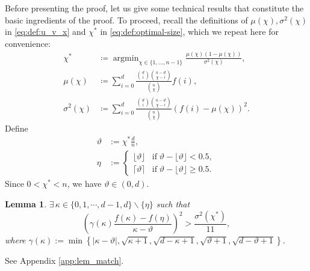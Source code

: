 \documentclass[onecolumn,letterpaper]{IEEEtran}
\DeclareMathOperator*{\argmin}{argmin}
\newtheorem{lemma}{Lemma}
\newcommand{\plsize}{{\chi}}
\newcommand{\mean}{{\mu}}
\newcommand{\var}{{\sigma^{2}}}
\newcommand{\nan}{{\kappa}}
\newcommand{\apn}{{\gamma}}
\newcommand{\mnp}{{\vartheta}}
\newcommand{\idex}{{i}}
\newcommand{\arb}{{\eta}}
\newcommand{\fh}{{h(f)}}
\begin{document}
Before presenting the proof, let us give some technical results that constitute the basic ingredients of the proof.
To proceed, recall the definitions of $\mean(\plsize), \var(\plsize)$ in \eqref{eq:def:u_v_x} and $\plsize^*$ in \eqref{eq:def:optimal-size}, which we repeat here for convenience: 
\begin{equation}
\label{eq:rep:def:mu:v:chi}
\begin{aligned} 
  \plsize^{*}&\coloneqq\argmin_{\plsize\in \{1,\dots,n-1\}} \frac{\mean(\plsize)(1-\mean(\plsize))}{\var(\plsize)},\\
   \mean(\plsize) &\coloneqq \sum\limits_{\idex=0}^{d} \frac{\binom{d}{\idex}\binom{n-d}{\plsize-\idex}}{\binom{n}{\plsize}} f(\idex), \\ 
    \var(\plsize) &\coloneqq \sum\limits_{\idex=0}^{d} \frac{\binom{d}{\idex}\binom{n-d}{\plsize-\idex}}{\binom{n}{\plsize}} \left(f(\idex)-\mean(\plsize)\right)^2.
\end{aligned}
\end{equation}
Define
\begin{align}
\mnp&:=\plsize^{*}\frac{d}{n}, \label{eq:def:vartheta}\\ 
\arb&:= 
    \left\{
    \begin{array}{ll}
    \lfloor \mnp \rfloor & \text{if} \; \mnp - \lfloor \mnp \rfloor < 0.5, \\
    \lceil \mnp \rceil & \text{if} \; \mnp - \lfloor \mnp \rfloor \ge 0.5.
    \end{array} 
    \right.  \label{eq:match:def:eta}
\end{align}
Since $0<\plsize^{*}<n$, we have $\mnp\in (0,d)$.
\begin{lemma}
\label{lem:match}
$\exists\,  \nan \in \{0,1,\cdots,d-1,d\} \backslash \{\arb\}$ such that
\begin{equation} 
\label{eq:mt:sttmt}
 \left(\apn(\nan) \frac{f(\nan) - f(\arb)}{ \nan-\mnp } \right) ^2  > \frac{\var(\plsize^{*})}{11}, 
\end{equation}
 where $\apn(\nan):=\min\left\{ |\nan-\mnp|, \sqrt{\nan+1}, \sqrt{d-\nan+1}, \sqrt{\mnp+1}, \sqrt{d-\mnp+1} \right\}$.
\end{lemma}
\begin{IEEEproof}
See Appendix \ref{app:lem_match}.
\end{IEEEproof}
\end{document}
